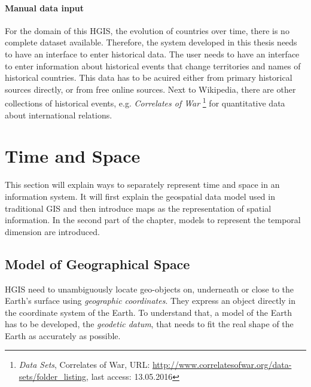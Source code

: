 
\paragraph{Manual data input} %
\label{par:manual_data_input}

For the domain of this HGIS, the evolution of countries over time, there is no complete dataset available. Therefore, the system developed in this thesis needs to have an interface to enter historical data. The user needs to have an interface to enter information about historical events that change territories and names of historical countries. This data has to be acuired either from primary historical sources directly, or from free online sources. Next to Wikipedia, there are other collections of historical events, e.g. \emph{Correlates of War}
\footnote{
  \textit{Data Sets},
  Correlates of War,
  URL: \url{http://www.correlatesofwar.org/data-sets/folder_listing},
  last access: 13.05.2016
}
for quantitative data about international relations.





\section{Time and Space} %
\label{sec:time_and_space}

This section will explain ways to separately represent time and space in an information system. It will first explain the geospatial data model used in traditional GIS and then introduce maps as the representation of spatial information. In the second part of the chapter, models to represent the temporal dimension are introduced.

\subsection{Model of Geographical Space} %
\label{sub:model_of_geographical_space}

HGIS need to unambiguously locate geo-objects on, underneath or close to the Earth's surface using \emph{geographic coordinates}. They express an object directly in the coordinate system of the Earth. To understand that, a model of the Earth has to be developed, the \emph{geodetic datum}, that needs to fit the real shape of the Earth as accurately as possible.

